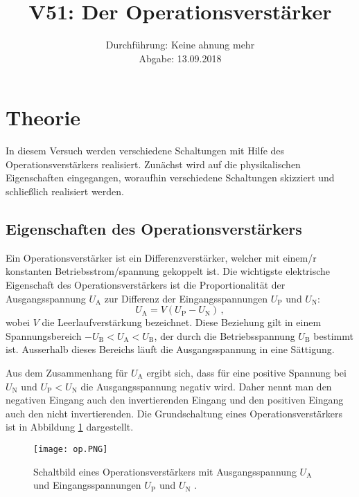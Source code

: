 \documentclass[
  bibliography=totoc,     %
  captions=tableheading,  %
  titlepage=firstiscover, %
]{scrartcl}
\title{V51: Der Operationsverstärker}
\author{
  Simon Schulte
  \texorpdfstring{
    \\
    \href{mailto:simon.schulte@udo.edu}{simon.schulte@udo.edu}
  }{}
  \texorpdfstring{\and}{, }
  Tim Sedlaczek
  \texorpdfstring{
    \\
    \href{mailto:tim.sedlaczek@udo.edu}{tim.sedlaczek@udo.edu}
  }{}
}
\date{Durchführung: Keine ahnung mehr\\
      Abgabe: 13.09.2018}
\begin{document}
\maketitle
\thispagestyle{empty}
\setcounter{page}{1}
\section{Theorie}
\label{sec:theorie}
In diesem Versuch werden verschiedene
Schaltungen mit Hilfe des Operationsverstärkers realisiert.
Zunächst wird auf die physikalischen Eigenschaften eingegangen,
woraufhin verschiedene Schaltungen skizziert und schließlich
realisiert werden.

\subsection{Eigenschaften des Operationsverstärkers}
\label{subsec:eigenschaften}
Ein Operationsverstärker ist ein Differenzverstärker, welcher mit einem/r konstanten
Betriebsstrom/spannung gekoppelt ist.
Die wichtigste elektrische Eigenschaft des Operationsverstärkers
ist die Proportionalität der Ausgangsspannung $U_\text{A}$ zur
Differenz der Eingangsspannungen $U_\text{P}$ und $U_\text{N}$:
\begin{equation}
\label{eq:proportionalität}
    U_\text{A} = V(U_\text{P} - U_\text{N})\,,
\end{equation}
wobei $V$ die Leerlaufverstärkung bezeichnet.
Diese Beziehung gilt in einem Spannungsbereich
$-U_\text{B} < U_\text{A} < U_\text{B}$, der durch die Betriebsspannung
$U_\text{B}$ bestimmt ist. Ausserhalb dieses Bereichs läuft die
Ausgangsspannung in eine Sättigung.

\noindent
Aus dem Zusammenhang für $U_\text{A}$ ergibt sich, dass für eine positive Spannung
bei $U_\text{N}$ und $U_\text{P} \less U_\text{N}$ die Ausgangsspannung negativ wird.
Daher nennt man den negativen Eingang auch den invertierenden Eingang und den positiven
Eingang auch den nicht invertierenden.
Die Grundschaltung eines Operationsverstärkers ist in Abbildung \ref{fig:op} dargestellt.
\begin{figure}
    \centering
    \texttt{[image: op.PNG]}
    \caption{
        Schaltbild eines Operationsverstärkers mit Ausgangsspannung
        $U_\text{A}$ und Eingangsspannungen $U_\text{P}$ und
        $U_\text{N}$ \cite{V51}.
    }
    \label{fig:op}
\end{figure}
\end{document}
